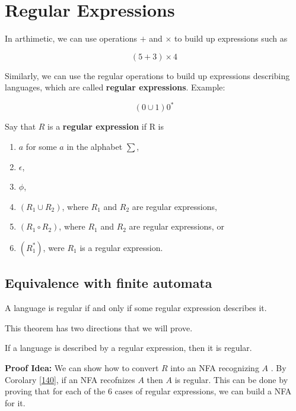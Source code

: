 \section{Regular Expressions}

In arthimetic, we can use operations $+$ and $\times$ to build up expressions
such as 

$$
(5 + 3) \times 4
$$

Similarly, we can use the regular operations to build up expressions describing
languages, which are called \textbf{regular expressions}. Example:

$$
(0 \cup 1)0^{*}
$$

\begin{defination}
    Say that $R$ is a \textbf{regular expression} if R is
    \begin{enumerate}
        \item $a$ for some $a$ in the alphabet $\sum$,
        \item $\epsilon$,
        \item $\phi$,
        \item $(R_1 \cup R_2)$, where $R_1$ and $R_2$ are regular expressions,
        \item $(R_1 \circ R_2)$, where $R_1$ and $R_2$ are regular
            expressions, or
        \item $(R_1^{*})$, were $R_1$ is a regular expression.
    \end{enumerate}
\end{defination}

\subsection{Equivalence with finite automata}

\begin{theorem}
    A language is regular if and only if some regular expression describes it.
\end{theorem}

This theorem has two directions that we will prove.

\begin{lemma}
    If a language is described by a regular expression, then it is regular.
\end{lemma}

\textbf{Proof Idea:} We can show how to convert $R$ into an NFA recognizing $A$
. By Corolary \ref{140}, if an NFA recofnizes $A$ then $A$ is regular. This
can be done by proving that for each of the 6 cases of regular expressions, 
we can build a NFA for it.

